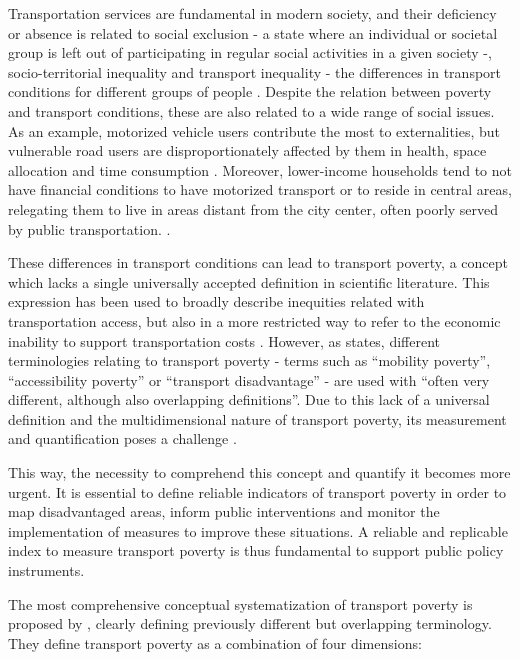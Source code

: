 \documentclass[
  authoryear,
  review,
  1p]{elsarticle}
\begin{document}
Transportation services are fundamental in modern society, and their
deficiency or absence is related to social exclusion - a state where an
individual or societal group is left out of participating in regular
social activities in a given society \citep{Pritchard_2014} -,
socio-territorial inequality and transport inequality - the differences
in transport conditions for different groups of people
\citep{Hidayati_2021}. Despite the relation between poverty and
transport conditions, these are also related to a wide range of social
issues. As an example, motorized vehicle users contribute the most to
externalities, but vulnerable road users are disproportionately affected
by them in health, space allocation and time consumption
\citep{Gossling_2016}. Moreover, lower-income households tend to not
have financial conditions to have motorized transport or to reside in
central areas, relegating them to live in areas distant from the city
center, often poorly served by public transportation.
\citep{Fedorowicz_2020} \citep{Lopes_2023}.

These differences in transport conditions can lead to transport poverty,
a concept which lacks a single universally accepted definition in
scientific literature. This expression has been used to broadly describe
inequities related with transportation access, but also in a more
restricted way to refer to the economic inability to support
transportation costs \citep{Mattioli_2018}. However, as
\citet{Lucas_2016} states, different terminologies relating to transport
poverty - terms such as ``mobility poverty'', ``accessibility poverty''
or ``transport disadvantage'' - are used with ``often very different,
although also overlapping definitions''. Due to this lack of a universal
definition and the multidimensional nature of transport poverty, its
measurement and quantification poses a challenge
\citep{Levinson_King_2020}.

This way, the necessity to comprehend this concept and quantify it
becomes more urgent. It is essential to define reliable indicators of
transport poverty in order to map disadvantaged areas, inform public
interventions and monitor the implementation of measures to improve
these situations. A reliable and replicable index to measure transport
poverty is thus fundamental to support public policy instruments.

The most comprehensive conceptual systematization of transport poverty
is proposed by \citet{Lucas_2016}, clearly defining previously different
but overlapping terminology. They define transport poverty as a
combination of four dimensions:
\end{document}
